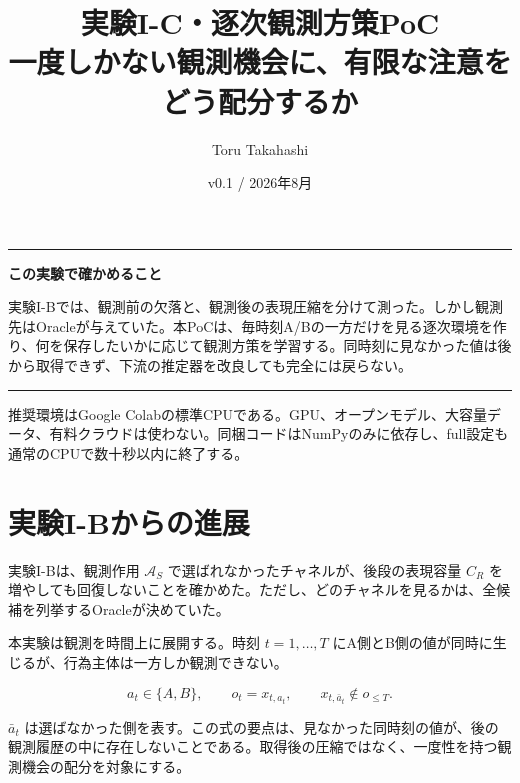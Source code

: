 \documentclass[11pt,a4paper]{ltjsarticle}
\title{\textbf{実験I-C・逐次観測方策PoC}\\
\large 一度しかない観測機会に、有限な注意をどう配分するか}
\author{Toru Takahashi}
\date{v0.1 / 2026年8月}
\newenvironment{takeaway}{\begin{center}\begin{minipage}{0.92\linewidth}\color{Main}\hrule\vspace{6pt}\color{black}}{\vspace{6pt}\color{Main}\hrule\color{black}\end{minipage}\end{center}}
\begin{document}
\maketitle

\begin{takeaway}
\textbf{この実験で確かめること}

実験I-Bでは、観測前の欠落と、観測後の表現圧縮を分けて測った。しかし観測先はOracleが与えていた。本PoCは、毎時刻A/Bの一方だけを見る逐次環境を作り、何を保存したいかに応じて観測方策を学習する。同時刻に見なかった値は後から取得できず、下流の推定器を改良しても完全には戻らない。
\end{takeaway}

推奨環境はGoogle Colabの標準CPUである。GPU、オープンモデル、大容量データ、有料クラウドは使わない。同梱コードはNumPyのみに依存し、full設定も通常のCPUで数十秒以内に終了する。

\tableofcontents

\section{実験I-Bからの進展}

実験I-Bは、観測作用 $\mathcal A_S$ で選ばれなかったチャネルが、後段の表現容量 $C_R$ を増やしても回復しないことを確かめた。ただし、どのチャネルを見るかは、全候補を列挙するOracleが決めていた。

本実験は観測を時間上に展開する。時刻 $t=1,\dots,T$ にA側とB側の値が同時に生じるが、行為主体は一方しか観測できない。

\begin{equation}
a_t\in\{A,B\},\qquad
o_t=x_{t,a_t},\qquad
x_{t,\bar a_t}\notin o_{\leq T}.
\end{equation}

$\bar a_t$ は選ばなかった側を表す。この式の要点は、見なかった同時刻の値が、後の観測履歴の中に存在しないことである。取得後の圧縮ではなく、一度性を持つ観測機会の配分を対象にする。

\begin{center}
\end{center}
\end{document}

